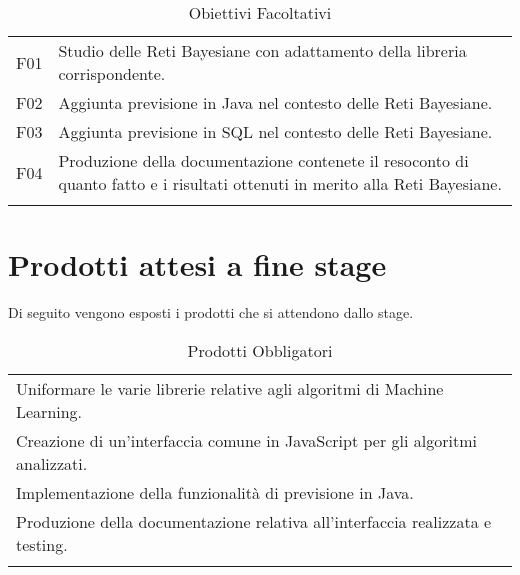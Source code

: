 {\renewcommand{\arraystretch}{2}
\begin{longtable}{|p{1cm}| p{12.25cm} |}
	\hline
	\rowcolor{blue} \multicolumn{2}{|c|}{
	{\textcolor{white}{Facoltativi}}
	} \\
		\endhead
		\hline \rowcolor{lightbrown}
		F01 & 
		Studio delle Reti Bayesiane con adattamento della libreria corrispondente.\\	
		\hline \rowcolor{lighterbrown}
		F02 & 
		Aggiunta previsione in Java nel contesto delle Reti Bayesiane. \\	
	\hline \rowcolor{lightbrown}
		F03 & 
		Aggiunta previsione in SQL nel contesto delle Reti Bayesiane. \\	
	\hline \rowcolor{lighterbrown}
		F04 & 
	Produzione della documentazione contenete il resoconto di quanto fatto e i risultati ottenuti in merito alla Reti Bayesiane. \\
	\hline
	\caption{Obiettivi Facoltativi}\label{tab:fac-ob}
\end{longtable}}

\pagebreak

\section{Prodotti attesi a fine stage}
 Di seguito vengono esposti i prodotti che si attendono dallo stage.
{\renewcommand{\arraystretch}{2}
\begin{longtable}{|p{13.25cm}|}
	\hline
	\rowcolor{blue} \multicolumn{1}{|c|}{
	\textbf{\textcolor{white}{Obbligatori}}
	} \\
		\endhead
		\hline \rowcolor{lightbrown}
		 Uniformare le varie librerie relative agli algoritmi di Machine Learning.\\	
		\hline \rowcolor{lighterbrown}
		 Creazione di un'interfaccia comune in JavaScript per gli algoritmi analizzati.\\	
		\hline \rowcolor{lightbrown}
		 Implementazione della funzionalità di previsione in Java. \\	
	\hline \rowcolor{lighterbrown}
		Produzione della documentazione relativa all'interfaccia realizzata e testing. \\	
	\hline
	\caption{Prodotti Obbligatori}\label{tab:obb-prod}
\end{longtable}}

